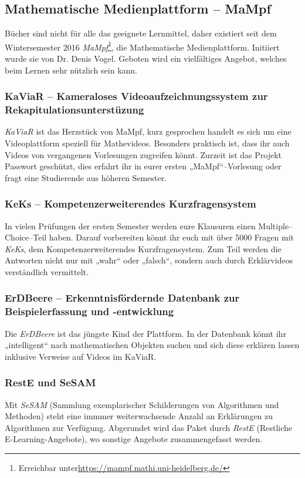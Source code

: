 \subsection{Mathematische Medienplattform -- MaMpf}
\label{mampf}

Bücher sind nicht für alle das geeignete Lernmittel, daher existiert seit dem Wintersemester 2016 \emph{MaMpf}\footnote{Erreichbar unter\url{https://mampf.mathi.uni-heidelberg.de/}}, die Mathematische Medienplattform. Initiiert wurde sie von Dr. Denis Vogel. Geboten wird ein vielfältiges Angebot, welches beim Lernen sehr nützlich sein kann.

\subsubsection{KaViaR -- Kameraloses Videoaufzeichnungssystem zur Rekapitulationsunterstüzung}
\emph{KaViaR} ist das Herzstück von MaMpf, kurz gesprochen handelt es sich um eine Videoplattform speziell für Mathevideos. Besonders praktisch ist, dass ihr auch Videos von vergangenen Vorlesungen zugreifen könnt. Zurzeit ist das Projekt  Passwort geschützt, dies erfahrt ihr in eurer ersten „MaMpf“--Vorlesung oder fragt eine Studierende aus höheren Semester.

\subsubsection{KeKs -- Kompetenzerweiterendes Kurzfragensystem}
In vielen Prüfungen der ersten Semester werden eure Klausuren einen Multiple--Choice--Teil haben.  Darauf vorbereiten könnt ihr euch mit über 5000 Fragen mit \emph{KeKs}, dem Kompetenzerweiterendes Kurzfragensystem. Zum Teil werden die Antworten nicht nur mit „waħr“ oder „falsch“, sondern auch durch Erklärvideos verständlich vermittelt.

\subsubsection{ErDBeere -- Erkenntnisfördernde Datenbank zur Beispielerfassung und -entwicklung}
 Die \emph{ErDBeere} ist das jüngste Kind der Plattform. In der Datenbank könnt ihr „intelligent“ nach mathematischen Objekten suchen und sich diese erklären lassen inklusive Verweise auf Videos im KaViaR.

\subsubsection{RestE und SeSAM}
Mit \emph{SeSAM} (Sammlung exemplarischer Schilderungen von Algorithmen und Methoden) steht eine immmer weiterwachsende Anzahl an Erklärungen zu Algorithmen zur Verfügung. Abgerundet wird das Paket durch \emph{RestE} (Restliche E-Learning-Angebote), wo sonstige Angebote zusammengefasst werden.
